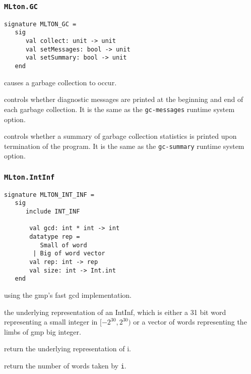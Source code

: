 \subsubsection{{\tt MLton.GC}}
\begin{verbatim}
signature MLTON_GC =
   sig
      val collect: unit -> unit
      val setMessages: bool -> unit
      val setSummary: bool -> unit
   end
\end{verbatim}

\begin{description}
causes a garbage collection to occur.

controls whether diagnostic messages are
printed at the beginning and end of each garbage collection.  It is
the same as the {\tt gc-messages} runtime system option.

controls whether a summary of garbage
collection statistics is printed upon termination of the program.  It
is the same as the {\tt gc-summary} runtime system option.

\end{description}

\subsubsection{{\tt MLton.IntInf}}
\begin{verbatim}
signature MLTON_INT_INF =
   sig
      include INT_INF

       val gcd: int * int -> int 
       datatype rep =
          Small of word
        | Big of word vector
       val rep: int -> rep
       val size: int -> Int.int
   end
\end{verbatim}

\begin{description}

using the gmp's fast gcd implementation.

the underlying representation of an IntInf, which is either a 31 bit word
representing a small integer in $[-2^{30}, 2^{30})$ or a vector of words
representing the limbs of gmp big integer.

return the underlying representation of i.

return the number of words taken by {\tt i}.

\end{description}


